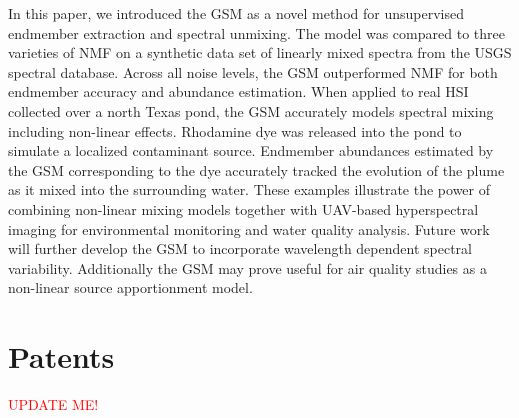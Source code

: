 \documentclass[remotesensing,article,submit,pdftex,moreauthors]{Definitions/mdpi}
\begin{document}
In this paper, we introduced the GSM as a novel method for unsupervised endmember extraction and spectral unmixing. The model was compared to three varieties of NMF on a synthetic data set of linearly mixed spectra from the USGS spectral database. Across all noise levels, the GSM outperformed NMF for both endmember accuracy and abundance estimation. When applied to real HSI collected over a north Texas pond, the GSM accurately models spectral mixing including non-linear effects. Rhodamine dye was released into the pond to simulate a localized contaminant source. Endmember abundances estimated by the GSM corresponding to the dye accurately tracked the evolution of the plume as it mixed into the surrounding water. These examples illustrate the power of combining non-linear mixing models together with UAV-based hyperspectral imaging for environmental monitoring and water quality analysis. Future work will further develop the GSM to incorporate wavelength dependent spectral variability. Additionally the GSM may prove useful for air quality studies as a non-linear source apportionment model.


\section{Patents}
\textcolor{red}{UPDATE ME!}



\vspace{6pt} 




\end{document}
